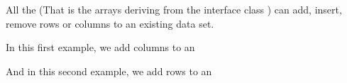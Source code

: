 \documentclass[a4paper,10pt]{article}
\begin{document}
All the  (That is the arrays deriving from the interface
class ) can add, insert, remove rows or columns to an existing
data set.

In this first example, we add columns to an 

\begin{minipage}[t]{0.5\textwidth}

\end{minipage}
\hspace{0.2cm}
\begin{minipage}[t]{0.5\textwidth}
\addtocounter{lstlisting}{-1}

\end{minipage}
And in this second example, we add rows to an 

\begin{minipage}[t]{0.5\textwidth}

\end{minipage}
\hspace{0.2cm}
\begin{minipage}[t]{0.5\textwidth}
\addtocounter{lstlisting}{-1}

\end{minipage}
\end{document}
